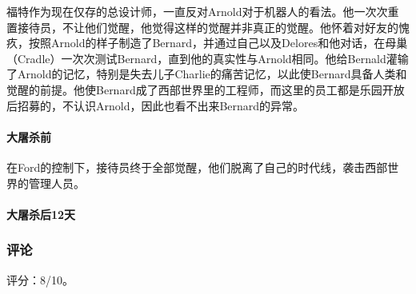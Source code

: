 福特作为现在仅存的总设计师，一直反对Arnold对于机器人的看法。他一次次重置接待员，不让他们觉醒，他觉得这样的觉醒并非真正的觉醒。他怀着对好友的愧疚，按照Arnold的样子制造了Bernard，并通过自己以及Delores和他对话，在母巢（Cradle）一次次测试Bernard，直到他的真实性与Arnold相同。他给Bernald灌输了Arnold的记忆，特别是失去儿子Charlie的痛苦记忆，以此使Bernard具备人类和觉醒的前提。他使Bernard成了西部世界里的工程师，而这里的员工都是乐园开放后招募的，不认识Arnold，因此也看不出来Bernard的异常。

\paragraph{大屠杀前}
在Ford的控制下，接待员终于全部觉醒，他们脱离了自己的时代线，袭击西部世界的管理人员。

\paragraph{大屠杀后12天}

\subsubsection{评论}

评分：8/10。